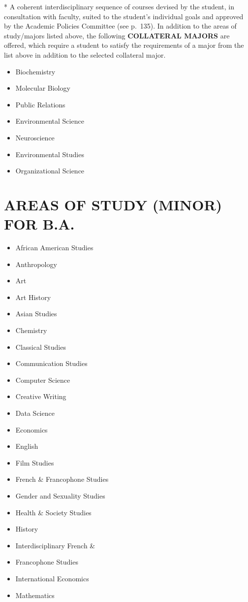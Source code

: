 \documentclass[
  letterpaper,
]{scrbook}
\providecommand{\tightlist}{%
  \setlength{\itemsep}{0pt}\setlength{\parskip}{0pt}}
\begin{document}
* A coherent interdisciplinary sequence of courses devised by the
student, in consultation with faculty, suited to the student's
individual goals and approved by the Academic Policies Committee (see
p.~135). In addition to the areas of study/majors listed above, the
following \textbf{COLLATERAL MAJORS} are offered, which require a
student to satisfy the requirements of a major from the list above in
addition to the selected collateral major.

\begin{itemize}
\tightlist
\item
  Biochemistry
\item
  Molecular Biology
\item
  Public Relations
\item
  Environmental Science
\item
  Neuroscience
\item
  Environmental Studies
\item
  Organizational Science
\end{itemize}

\section{AREAS OF STUDY (MINOR) FOR
B.A.}\label{areas-of-study-minor-for-b.a.}

\begin{itemize}
\tightlist
\item
  African American Studies
\item
  Anthropology
\item
  Art
\item
  Art History
\item
  Asian Studies
\item
  Chemistry
\item
  Classical Studies
\item
  Communication Studies
\item
  Computer Science
\item
  Creative Writing
\item
  Data Science
\item
  Economics
\item
  English
\item
  Film Studies
\item
  French \& Francophone Studies
\item
  Gender and Sexuality Studies
\item
  Health \& Society Studies
\item
  History
\item
  Interdisciplinary French \&
\item
  Francophone Studies
\item
  International Economics
\item
  Mathematics
\end{itemize}
\end{document}
